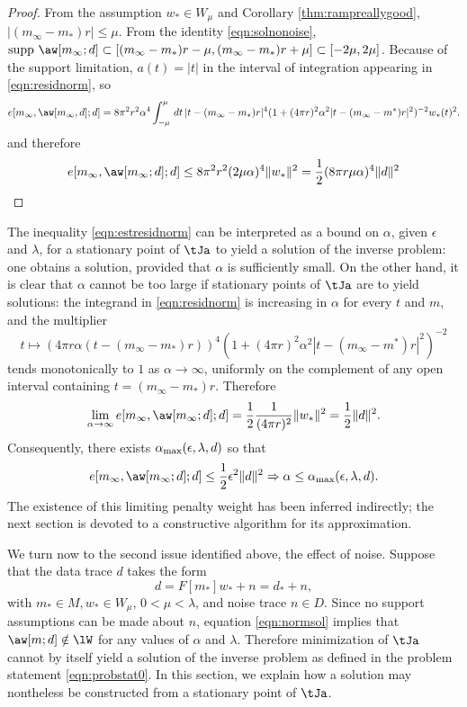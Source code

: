 \begin{proof}
  From the assumption $w_* \in W_{\mu}$ and Corollary
  \ref{thm:rampreallygood}, $|(m_{\infty}-m_*)r|\le \mu$. From the
  identity \ref{eqn:solnonoise},
  $\mbox{supp }\aw[m_{\infty};d] \subset
  [(m_{\infty}-m_*)r-\mu,(m_{\infty}-m_*)r+\mu] \subset
  [-2\mu,2\mu]$. Because of the support limitation, $a(t)=|t|$ in the
  interval of integration appearing in \ref{eqn:residnorm}, so
\[
  e[m_{\infty},\aw[m_{\infty},d];d] 
= 8 \pi^2 r^2 \alpha^4\int^{\mu}_{-\mu}\,dt\,|t-(m_{\infty}-m_*)r|^4(1+(4\pi r)^2 \alpha^2 
|t-(m_{\infty}-m^*)r|^2)^{-2}w_*(t)^2.
\]
and therefore
\begin{equation}
  \label{eqn:estresidnorm}
e[m_{\infty},\aw[m_{\infty};d];d] \le 8 \pi^2 r^2 (2\mu\alpha)^4 \|w_*\|^2 =
\frac{1}{2}(8 \pi r \mu \alpha)^4 \|d\|^2
\end{equation}
\end{proof}

The inequality \ref{eqn:estresidnorm} can be interpreted as a bound 
on $\alpha$, given $\epsilon$ and $\lambda$, for a
stationary point of $\tJa$ to yield a solution of the inverse
problem: one obtains a solution, provided that $\alpha$ is
sufficiently small. On the other hand, it is clear that $\alpha$
cannot be too large if stationary points of $\tJa$ are to yield
solutions: the integrand in \ref{eqn:residnorm} is increasing in
$\alpha$ for every $t$ and $m$, and the multiplier
\[
t \mapsto (4\pi r \alpha(t-(m_{\infty}-m_*)r))^4(1+(4\pi r)^2 \alpha^2 
|t-(m_{\infty}-m^*)r|^2)^{-2}
\]
tends monotonically to $1$ as $\alpha \rightarrow \infty$, uniformly
on the complement of any open interval containing
$t=(m_{\infty}-m_*)r$. Therefore
\begin{equation}
  \label{eqn:elimit}
  \lim_{\alpha \rightarrow \infty}e[m_{\infty},\aw[m_{\infty};d];d] =
  \frac{1}{2}\frac{1}{(4 \pi r)^2}\|w_*\|^2 = \frac{1}{2}\|d\|^2.
\end{equation}
Consequently, there exists $\alpha_{\rm max}(\epsilon,\lambda,d)$ so
that
\[
  e[m_{\infty},\aw[m_{\infty};d];d]  \le \frac{1}{2}\epsilon^2\|d\|^2
  \Rightarrow \alpha \le \alpha_{\rm max}(\epsilon,\lambda,d).
\]
The existence of this limiting penalty weight has been inferred
indirectly; the next section is devoted to a constructive algorithm
for its approximation.

We turn now to the second issue identified above, the effect of
noise. Suppose that the data trace $d$ takes the form
\begin{equation}
  \label{eqn:defdatanoisy}
  d = F[m_*]w_* + n = d_*+n,
\end{equation}
with $m_* \in M, w_* \in W_{\mu}$, $0<\mu<\lambda$, and noise trace $n \in
D$. Since no support assumptions can be made about $n$, equation
\ref{eqn:normsol} implies that $\aw[m;d] \notin \lW$ for any values of
$\alpha$ and $\lambda$.  Therefore minimization of $\tJa$ cannot by itself yield a
solution of the inverse problem as defined in the problem statement
\ref{eqn:probstat0}. In this section, we explain how a solution may
nontheless be constructed from a stationary point of $\tJa$.

